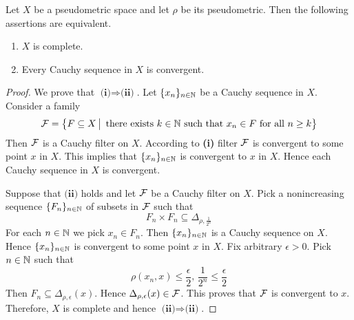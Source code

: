 \begin{theorem}\label{theorem:completeness_for_pseudometric_spaces_is_equivalent_to_convergence_of_Cauchy_sequences}
	Let $X$ be a pseudometric space and let $\rho$ be its pseudometric. Then the following assertions are equivalent.
	\begin{enumerate}[label=\emph{\textbf{(\roman*)}}, leftmargin=3.0em]
		\item $X$ is complete.
		\item Every Cauchy sequence in $X$ is convergent.
	\end{enumerate}
\end{theorem}
\begin{proof}
	We prove that $\textbf{(i)} \Rightarrow \textbf{(ii)}$. Let $\{x_n\}_{n \in {\mathbb N}}$ be a Cauchy sequence in $X$. Consider a family
	$${\mathcal F} = \big\{F\subseteq X\,\big|\,\mbox{ there exists }k\in {\mathbb N}\mbox{ such that }x_n \in F\mbox{ for all }n\geq k\big\}$$
	Then ${\mathcal F}$ is a Cauchy filter on $X$. According to \textbf{(i)} filter ${\mathcal F}$ is convergent to some point $x$ in $X$. This implies that $\{x_n\}_{n \in {\mathbb N}}$ is convergent to $x$ in $X$. Hence each Cauchy sequence in $X$ is convergent.

	Suppose that $\textbf{(ii)}$ holds and let ${\mathcal F}$ be a Cauchy filter on $X$. Pick a nonincreasing sequence $\{F_n\}_{n\in {\mathbb N}}$ of subsets in ${\mathcal F}$ such that
	$$F_n \times F_n \subseteq \Delta_{\rho, \frac{1}{2^n}}$$
	For each $n \in {\mathbb N}$ we pick $x_n \in F_n$. Then $\{x_n\}_{n \in {\mathbb N}}$ is a Cauchy sequence on $X$. Hence $\{x_n\}_{n \in {\mathbb N}}$ is convergent to some point $x$ in $X$. Fix arbitrary $\epsilon > 0$. Pick $n \in {\mathbb N}$ such that
	$$\rho(x_n,x) \leq \frac{\epsilon}{2},\,\frac{1}{2^n} \leq \frac{\epsilon}{2}$$
	Then $F_n \subseteq \Delta_{\rho, \epsilon}(x)$. Hence $\Delta_{\rho, \epsilon}(x) \in {\mathcal F}$. This proves that ${\mathcal F}$ is convergent to $x$. Therefore, $X$ is complete and hence $\textbf{(ii)}\Rightarrow \textbf{(ii)}$.
\end{proof}


